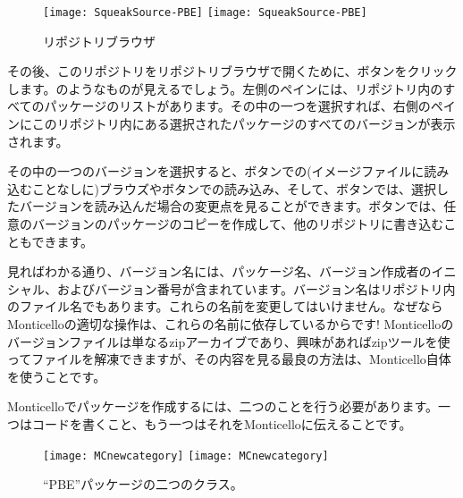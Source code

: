 \documentclass[a4paper,10pt,twoside]{book}
\begin{document}
\begin{figure}[btp]
\begin{center}
\ifluluelse
{\texttt{[image: SqueakSource-PBE]}}
{\texttt{[image: SqueakSource-PBE]}}
\end{center}
\caption{リポジトリブラウザ}
\end{figure}
\noindent
その後、このリポジトリをリポジトリブラウザで開くために、ボタンをクリックします。のようなものが見えるでしょう。左側のペインには、リポジトリ内のすべてのパッケージのリストがあります。その中の一つを選択すれば、右側のペインにこのリポジトリ内にある選択されたパッケージのすべてのバージョンが表示されます。

その中の一つのバージョンを選択すると、ボタンでの(イメージファイルに読み込むことなしに)ブラウズやボタンでの読み込み、そして、ボタンでは、選択したバージョンを読み込んだ場合の変更点を見ることができます。ボタンでは、任意のバージョンのパッケージのコピーを作成して、他のリポジトリに書き込むこともできます。

見ればわかる通り、バージョン名には、パッケージ名、バージョン作成者のイニシャル、およびバージョン番号が含まれています。バージョン名はリポジトリ内のファイル名でもあります。これらの名前を変更してはいけません。なぜならMonticelloの適切な操作は、これらの名前に依存しているからです! Monticelloのバージョンファイルは単なるzipアーカイブであり、興味があればzipツールを使ってファイルを解凍できますが、その内容を見る最良の方法は、Monticello自体を使うことです。

Monticelloでパッケージを作成するには、二つのことを行う必要があります。一つはコードを書くこと、もう一つはそれをMonticelloに伝えることです。


\begin{figure}[btp]
\begin{center}
\ifluluelse
{\texttt{[image: MCnewcategory]}}
{\texttt{[image: MCnewcategory]}}
\end{center}
\caption{``PBE''パッケージの二つのクラス。}
\end{figure}
\end{document}
